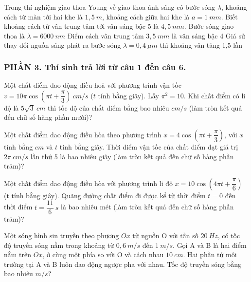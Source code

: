 \begin{ex}
	Trong thí nghiệm giao thoa Young về giao thoa ánh sáng có bước sóng $\lambda$, khoảng cách từ màn tới hai khe là $1,5 ~m$, khoảng cách giữa hai khe là $a=1 ~mm$. Biết khoảng cách từ vân trung tâm tới vân sáng bậc 5 là $4,5 ~mm$.
	{Bước sóng giao thoa là $\lambda=6000~nm$}
	{Điểm cách vân trung tâm $3,5 ~mm$ là vân sáng bậc 4}
	{Giá sử thay đổi nguồn sáng phát ra bước sóng $\lambda=0,4\ \mu m$ thì khoảng vân tăng 1,5 lần}
	
	\loigiai{
		\begin{itemchoice}
			\itemch 
			\itemch 
			\itemch 
			\itemch 
			
		\end{itemchoice}
	}
\end{ex}
\subsubsection*{PHẦN 3. Thí sinh trả lời từ câu 1 đến câu 6.}
\setcounter{ex}{0}
\begin{ex}
	Một chất điểm dao động điều hoà với phương trình vận tốc $v=10 \pi \cos (\pi t+\dfrac{\pi}{3})\ cm/s$ ($t$ tính bằng giây). Lấy $\pi^2=10$. Khi chất điểm có li độ là $5 \sqrt{3}\ cm$ thì tốc độ của chất điểm bằng bao nhiêu $cm/s$ (làm tròn kết quả đến chữ số hàng phần mười)? 
	\loigiai{
	}
\end{ex}
\begin{ex}
	Một chất điểm dao động điều hòa theo phương trình $x=4 \cos \left(\pi t+\dfrac{\pi}{3}\right)$, với $x$ tính bằng $cm$ và $t$ tính bằng giây. Thời điểm vận tốc của chất điểm đạt giá trị $2 \pi\ cm/s$ lần thứ 5 là bao nhiêu giây (làm tròn kết quả đến chữ số hàng phần trăm)?
	 
\end{ex}
\begin{ex}
	Một chất điểm dao động điều hòa với phương trình li độ $x=10 \cos \left(4 \pi t+\dfrac{\pi}{6}\right)$
	(t tính bằng giây). Quãng đường chất điểm đi được kể từ thời điểm $t=0$ đến thời điểm $t=\dfrac{11}{6}\ s$ là bao nhiêu mét (làm tròn kết quả đến chữ số hàng phần trăm)?
\end{ex}
\begin{ex}
	Một sóng hình sin truyền theo phương $Ox$ từ nguồn O với tần số $20 \ Hz$, có tốc độ truyền sóng nằm trong khoảng từ $0,6\ m/s$ đến $1 \ m/s$. Gọi A và B là hai điểm nằm trên $Ox$, ở cùng một phía so với O và cách nhau $10\ cm$. Hai phần tử môi trường tại A và B luôn dao động ngược pha với nhau. Tốc độ truyền sóng bằng bao nhiêu $m/s$? 
\end{ex}
